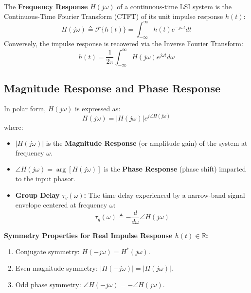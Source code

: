 \documentclass[12pt,a4paper]{article}
\begin{document}
\begin{tcolorbox}[defbox, title={\textbf{Definition: Frequency Response}}]
The \textbf{Frequency Response} $H(j\omega)$ of a continuous-time LSI system is the Continuous-Time Fourier Transform (CTFT) of its unit impulse response $h(t)$:
\begin{equation}
  H(j\omega) \triangleq \mathcal{F}\{h(t)\} = \int_{-\infty}^{\infty} h(t) e^{-j\omega t} dt
\end{equation}
Conversely, the impulse response is recovered via the Inverse Fourier Transform:
\begin{equation}
  h(t) = \frac{1}{2\pi} \int_{-\infty}^{\infty} H(j\omega) e^{j\omega t} d\omega
\end{equation}
\end{tcolorbox}

\subsection{Magnitude Response and Phase Response}
In polar form, $H(j\omega)$ is expressed as:
\begin{equation}
  H(j\omega) = |H(j\omega)| e^{j \angle H(j\omega)}
\end{equation}
where:
\begin{itemize}[topsep=2pt, itemsep=2pt]
  \item $|H(j\omega)|$ is the \textbf{Magnitude Response} (or amplitude gain) of the system at frequency $\omega$.
  \item $\angle H(j\omega) = \arg[H(j\omega)]$ is the \textbf{Phase Response} (phase shift) imparted to the input phasor.
  \item \textbf{Group Delay $\tau_g(\omega)$:} The time delay experienced by a narrow-band signal envelope centered at frequency $\omega$:
  \begin{equation}
    \tau_g(\omega) \triangleq -\frac{d}{d\omega} \angle H(j\omega)
  \end{equation}
\end{itemize}

\textbf{Symmetry Properties for Real Impulse Response $h(t) \in \mathbb{R}$:}
\begin{enumerate}[topsep=2pt, itemsep=2pt]
  \item Conjugate symmetry: $H(-j\omega) = H^*(j\omega)$.
  \item Even magnitude symmetry: $|H(-j\omega)| = |H(j\omega)|$.
  \item Odd phase symmetry: $\angle H(-j\omega) = -\angle H(j\omega)$.
\end{enumerate}
\end{document}
